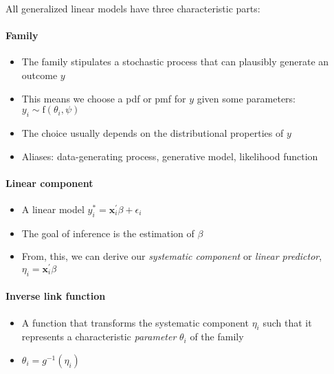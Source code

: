 \documentclass[
  11pt,
]{article}
\providecommand{\tightlist}{%
  \setlength{\itemsep}{0pt}\setlength{\parskip}{0pt}}
\begin{document}
All generalized linear models have three characteristic parts:

\hypertarget{family}{%
\paragraph{Family}\label{family}}

\begin{itemize}
\tightlist
\item
  The family stipulates a stochastic process that can plausibly generate an outcome \(y\)
\item
  This means we choose a pdf or pmf for \(y\) given some parameters: \(y_i \sim \text{f}(\theta_i, \psi)\)
\item
  The choice usually depends on the distributional properties of \(y\)
\item
  Aliases: data-generating process, generative model, likelihood function
\end{itemize}

\hypertarget{linear-component}{%
\paragraph{Linear component}\label{linear-component}}

\begin{itemize}
\tightlist
\item
  A linear model \(y_i^{\ast} = \mathbf{x}_i^{\prime} \beta + \epsilon_i\)
\item
  The goal of inference is the estimation of \(\beta\)
\item
  From, this, we can derive our \emph{systematic component} or \emph{linear predictor}, \(\eta_i = \mathbf{x}_i^{\prime} \beta\)
\end{itemize}

\hypertarget{inverse-link-function}{%
\paragraph{Inverse link function}\label{inverse-link-function}}

\begin{itemize}
\tightlist
\item
  A function that transforms the systematic component \(\eta_i\) such that it represents a characteristic \emph{parameter} \(\theta_i\) of the family
\item
  \(\theta_i = g^{-1}(\eta_i)\)
\end{itemize}
\end{document}
